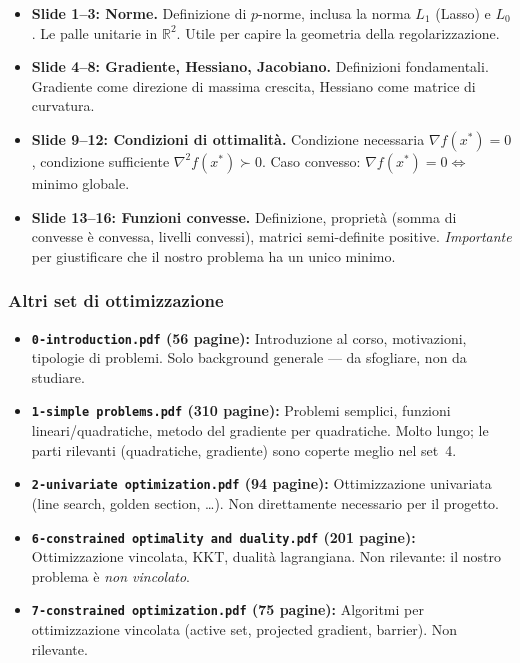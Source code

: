 \documentclass[a4paper,11pt]{article}
\theoremstyle{definition}
\newcommand{\R}{\mathbb{R}}
\begin{document}
\begin{itemize}
  \item \textbf{Slide 1--3: Norme.} Definizione di $p$-norme, inclusa la norma $L_1$ (Lasso) e $L_0$. Le palle unitarie in $\R^2$. Utile per capire la geometria della regolarizzazione.

  \item \textbf{Slide 4--8: Gradiente, Hessiano, Jacobiano.} Definizioni fondamentali. Gradiente come direzione di massima crescita, Hessiano come matrice di curvatura.

  \item \textbf{Slide 9--12: Condizioni di ottimalità.} Condizione necessaria $\nabla f(x^*) = 0$, condizione sufficiente $\nabla^2 f(x^*) \succ 0$. Caso convesso: $\nabla f(x^*) = 0 \Leftrightarrow$ minimo globale.

  \item \textbf{Slide 13--16: Funzioni convesse.} Definizione, proprietà (somma di convesse è convessa, livelli convessi), matrici semi-definite positive. \emph{Importante} per giustificare che il nostro problema ha un unico minimo.
\end{itemize}

\subsubsection*{ \quad Altri set di ottimizzazione}

\begin{itemize}
  \item \textbf{\texttt{0-introduction.pdf} (56 pagine):} Introduzione al corso, motivazioni, tipologie di problemi. Solo background generale --- da sfogliare, non da studiare.

  \item \textbf{\texttt{1-simple problems.pdf} (310 pagine):} Problemi semplici, funzioni lineari/quadratiche, metodo del gradiente per quadratiche. Molto lungo; le parti rilevanti (quadratiche, gradiente) sono coperte meglio nel set~4.

  \item \textbf{\texttt{2-univariate optimization.pdf} (94 pagine):} Ottimizzazione univariata (line search, golden section, \ldots). Non direttamente necessario per il progetto.

  \item \textbf{\texttt{6-constrained optimality and duality.pdf} (201 pagine):} Ottimizzazione vincolata, KKT, dualità lagrangiana. Non rilevante: il nostro problema è \emph{non vincolato}.

  \item \textbf{\texttt{7-constrained optimization.pdf} (75 pagine):} Algoritmi per ottimizzazione vincolata (active set, projected gradient, barrier). Non rilevante.
\end{itemize}
\end{document}
